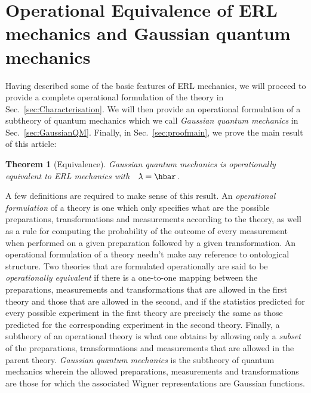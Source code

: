 \documentclass[pra,superscriptaddress,nofootinbib,12pt]{revtex4-2}
\newtheorem{theorem}{Theorem}
\begin{document}
\section{Operational Equivalence of ERL mechanics and Gaussian quantum mechanics}
\label{sec:Equivalence}

Having described some of the basic features of ERL mechanics, we will proceed to provide a complete operational formulation of the theory in Sec.~\ref{sec:Characterisation}.  We will then provide an operational formulation of a subtheory of quantum mechanics which we call \emph{Gaussian quantum mechanics} in Sec.~\ref{sec:GaussianQM}.  Finally, in Sec.~\ref{sec:proofmain}, we prove the main result of this article:
\begin{theorem}[Equivalence]
\label{thm:Gaussian}
Gaussian quantum mechanics is operationally equivalent to ERL mechanics with $\lambdabar=\hbar$.
\end{theorem}

A few definitions are required to make sense of this result.  An \emph{operational formulation} of a theory is one which only specifies what are the possible preparations, transformations and
measurements according to the theory, as well as a rule for computing the probability of the outcome of every measurement when performed on a given preparation followed by a given transformation.  An operational formulation of a theory needn't make any reference to ontological structure.
Two theories that are formulated operationally are said to be \emph{operationally equivalent}
 if there is a one-to-one mapping between the preparations, measurements and transformations that are allowed in the first theory and those that are allowed in the second, and if the statistics predicted for every possible experiment in the first theory are precisely the same as those predicted for the corresponding experiment in the second theory.  Finally, a subtheory of an operational theory is what one obtains by allowing only a \emph{subset} of the preparations, transformations and measurements that are allowed in the parent theory. \emph{Gaussian quantum mechanics} is the subtheory of quantum mechanics wherein the allowed preparations, measurements and transformations are those for which the associated Wigner representations are Gaussian functions.
\end{document}
